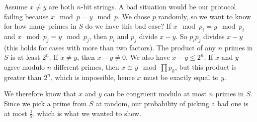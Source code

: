 \documentclass[twoside]{article}
\begin{document}
Assume $x\neq y$ are both $n$-bit strings.  A bad situation would be our protocol failing because $x\mod p = y\mod p$.  We chose $p$ randomly, so we want to know for how many primes in $S$ do we have this bad case?  If $x\mod p_i = y\mod p_i$ and $x\mod p_j = y\mod p_j$, then $p_i$  and $p_j$ divide $x-y$.  So $p_ip_j$ divides $x-y$ (this holds for cases with more than two factors).  The product of any $n$ primes in $S$ is at least $2^n$.  If $x\neq y$, then $x-y\neq 0$.  We also have $x-y \leq 2^n$.  If $x$ and $y$ agree modulo $n$ different primes, then $x\cong y \mod \prod p_k$, but this product is greater than $2^n$, which is impossible, hence $x$ must be exactly equal to $y$.

We therefore know that $x$ and $y$ can be congruent modulo at most $n$ primes in $S$.  Since we pick a prime from $S$ at random, our probability of picking a bad one is at most $\frac{1}{2}$, which is what we wanted to show.
\end{document}
